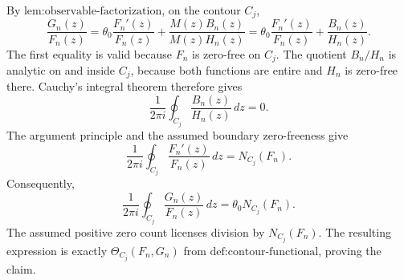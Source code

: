 By \(\text{lem:observable-factorization}\), on the contour \(C_j\),
\[
 \frac{G_n(z)}{F_n(z)}
 =\theta_0\frac{F_n'(z)}{F_n(z)}
   +\frac{M(z)B_n(z)}{M(z)H_n(z)}
 =\theta_0\frac{F_n'(z)}{F_n(z)}+\frac{B_n(z)}{H_n(z)}.
\]
The first equality is valid because \(F_n\) is zero-free on \(C_j\).  The quotient \(B_n/H_n\) is analytic on and inside \(C_j\), because both functions are entire and \(H_n\) is zero-free there.  Cauchy's integral theorem therefore gives
\[
 \frac{1}{2\pi i}\oint_{C_j}\frac{B_n(z)}{H_n(z)}\,dz=0.
\]
The argument principle and the assumed boundary zero-freeness give
\[
 \frac{1}{2\pi i}\oint_{C_j}\frac{F_n'(z)}{F_n(z)}\,dz
 =N_{C_j}(F_n).
\]
Consequently,
\[
 \frac{1}{2\pi i}\oint_{C_j}\frac{G_n(z)}{F_n(z)}\,dz
 =\theta_0N_{C_j}(F_n).
\]
The assumed positive zero count licenses division by \(N_{C_j}(F_n)\).  The resulting expression is exactly \(\Theta_{C_j}(F_n,G_n)\) from \(\text{def:contour-functional}\), proving the claim.